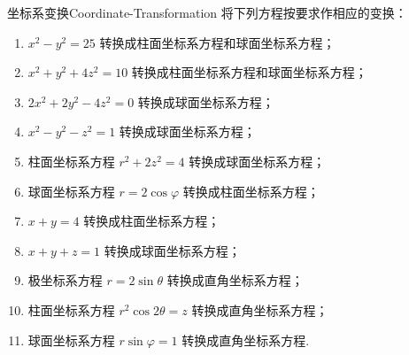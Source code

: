 \begin{problem}{坐标系变换}{Coordinate-Transformation}
    将下列方程按要求作相应的变换：
    \begin{enumerate}
        \item $x^2 - y^2 = 25$ 转换成柱面坐标系方程和球面坐标系方程；
        \item $x^2 + y^2 + 4z^2 = 10$ 转换成柱面坐标系方程和球面坐标系方程；
        \item $2x^2 + 2y^2 - 4z^2 = 0$ 转换成球面坐标系方程；
        \item $x^2 - y^2 - z^2 = 1$ 转换成球面坐标系方程；
        \item 柱面坐标系方程 $r^2 + 2z^2 = 4$ 转换成球面坐标系方程；
        \item 球面坐标系方程 $r = 2 \cos \varphi$ 转换成柱面坐标系方程；
        \item $x + y = 4$ 转换成柱面坐标系方程；
        \item $x + y + z = 1$ 转换成球面坐标系方程；
        \item 极坐标系方程 $r = 2 \sin \theta$ 转换成直角坐标系方程；
        \item 柱面坐标系方程 $r^2 \cos 2\theta = z$ 转换成直角坐标系方程；
        \item 球面坐标系方程 $r \sin \varphi = 1$ 转换成直角坐标系方程.
    \end{enumerate}
\end{problem}

